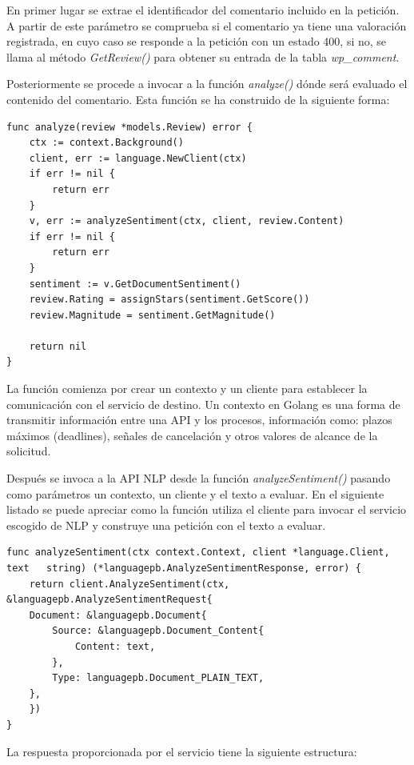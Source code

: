 En primer lugar se extrae el identificador del comentario incluido en la petición. A partir de este parámetro se comprueba si el comentario ya tiene una valoración registrada, en cuyo caso se responde a la petición con un estado 400, si no, se llama al método \textit{GetReview()} para obtener su entrada de la tabla \textit{wp\_comment}.

Posteriormente se procede a invocar a la función \textit{analyze()} dónde será evaluado el contenido del comentario. Esta función se ha construido de la siguiente forma:

\begin{lstlisting}[caption= Funci\'on que envuelve la llamada a la API de NLP]
func analyze(review *models.Review) error {
	ctx := context.Background()
	client, err := language.NewClient(ctx)
	if err != nil {
		return err
	}
	v, err := analyzeSentiment(ctx, client, review.Content)
	if err != nil {
		return err
	}
	sentiment := v.GetDocumentSentiment()
	review.Rating = assignStars(sentiment.GetScore())
	review.Magnitude = sentiment.GetMagnitude()

	return nil
}
\end{lstlisting}

La función comienza por crear un contexto y un cliente para establecer la comunicación con el servicio de destino. Un contexto en Golang es una forma de transmitir información entre una API y los procesos, información como: plazos máximos (deadlines), señales de cancelación y otros valores de alcance de la solicitud. 

Después se invoca a la API NLP desde la función \textit{analyzeSentiment()} pasando como parámetros un contexto, un cliente y el texto a evaluar. En el siguiente listado se puede apreciar como la función utiliza el cliente para invocar el servicio escogido de NLP y construye una petición con el texto a evaluar. 

\begin{lstlisting}[caption= Llamada a la API de NLP]
func analyzeSentiment(ctx context.Context, client *language.Client, text   string) (*languagepb.AnalyzeSentimentResponse, error) {
    return client.AnalyzeSentiment(ctx, &languagepb.AnalyzeSentimentRequest{
	Document: &languagepb.Document{
		Source: &languagepb.Document_Content{
			Content: text,
		},
		Type: languagepb.Document_PLAIN_TEXT,
	},
    })
}
\end{lstlisting}

La respuesta proporcionada por el servicio tiene la siguiente estructura:

